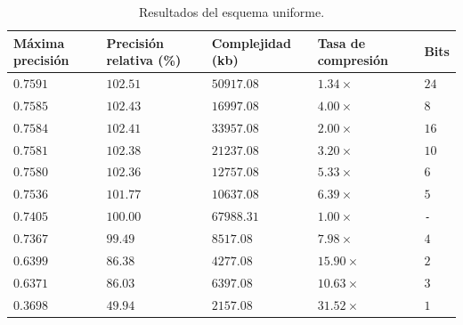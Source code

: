 {\footnotesize
\begin{table}[H]
    \centering
    \caption{Resultados del esquema uniforme.}
    \label{tab:uniform_results}

    \renewcommand{\tabularxcolumn}[1]{>{\arraybackslash}m{#1}}

    \begin{tabularx}{\textwidth}{@{}
        >{\centering\arraybackslash}X  %
        >{\centering\arraybackslash}X  %
        >{\centering\arraybackslash}X  %
        >{\centering\arraybackslash}X  %
        >{\centering\arraybackslash}X  %
    @{}}
        \toprule
        \textbf{Máxima precisión} &
        \textbf{Precisión relativa (\%)} &
        \textbf{Complejidad (kb)} &
        \textbf{Tasa de compresión} &
        \textbf{Bits} \\
        \midrule
        $0.7591$ & $102.51$ & $50917.08$ & $1.34\times$ & $24$ \\
        $0.7585$ & $102.43$ & $16997.08$ & $4.00\times$ & $8$ \\
        $0.7584$ & $102.41$ & $33957.08$ & $2.00\times$ & $16$ \\
        $0.7581$ & $102.38$ & $21237.08$ & $3.20\times$ & $10$ \\
        $0.7580$ & $102.36$ & $12757.08$ & $5.33\times$ & $6$ \\
        $0.7536$ & $101.77$ & $10637.08$ & $6.39\times$ & $5$ \\
        \rowcolor{gray!20}
        $0.7405$ & $100.00$ & $67988.31$ & $1.00\times$ & \texttt{-} \\
        $0.7367$ & $99.49$ & $8517.08$ & $7.98\times$ & $4$ \\
        $0.6399$ & $86.38$ & $4277.08$ & $15.90\times$ & $2$ \\
        $0.6371$ & $86.03$ & $6397.08$ & $10.63\times$ & $3$ \\
        $0.3698$ & $49.94$ & $2157.08$ & $31.52\times$ & $1$ \\
        \bottomrule
    \end{tabularx}
\end{table}
}
